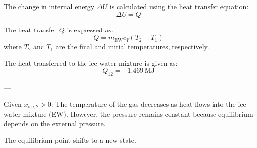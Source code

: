 The change in internal energy \( \Delta U \) is calculated using the heat transfer equation:  
\[
\Delta U = Q
\]  

The heat transfer \( Q \) is expressed as:  
\[
Q = m_{\text{EW}} c_V (T_2 - T_1)
\]  
where \( T_2 \) and \( T_1 \) are the final and initial temperatures, respectively.  

The heat transferred to the ice-water mixture is given as:  
\[
Q_{12} = -1.469 \, \text{MJ}
\]  

---

Given \( x_{\text{ice},2} > 0 \):  
The temperature of the gas decreases as heat flows into the ice-water mixture (EW). However, the pressure remains constant because equilibrium depends on the external pressure.  

The equilibrium point shifts to a new state.
